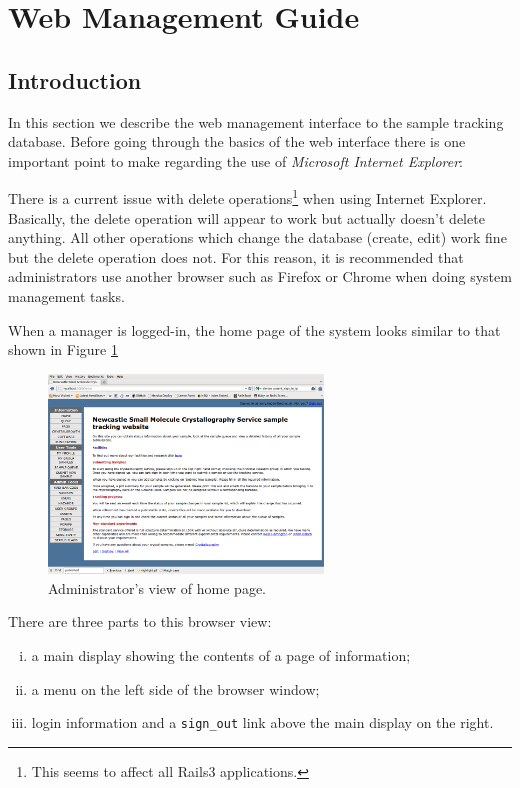 \documentclass[12pt,twoside]{article}
\begin{document}
\section{Web Management Guide}
\subsection{Introduction}
In this section we describe the web management interface to the
sample tracking database. 
Before going through the basics of the web interface there is one
important point to make regarding the use of 
\emph{Microsoft Internet Explorer}:

\begin{plainblock}
There is a current issue with delete operations\footnote{This seems to affect
all Rails3 applications.} when using 
Internet Explorer. Basically, the delete operation will appear to work
but actually doesn't delete anything. All other operations which change the
database (create, edit) work fine but the delete operation does not.
For this reason, it is recommended that administrators use another browser
such as Firefox or Chrome when doing system management tasks.
\end{plainblock}

When a manager is logged-in, the home page of
the system looks similar to that shown in Figure \ref{fig:homepage}

\begin{figure}[!htb]
\begin{center}
\includegraphics[width=0.65\textwidth]{homepage}
\caption{Administrator's view of home page.\label{fig:homepage}}
\end{center}
\end{figure}

There are three parts to this browser view:
\begin{enumerate}[(i)]
\item
a main display showing the contents of a page of information;
\item
a menu on the left side of the browser window;
\item
login information and a \verb=sign_out= link above the main display on
the right.
\end{enumerate}
\end{document}
